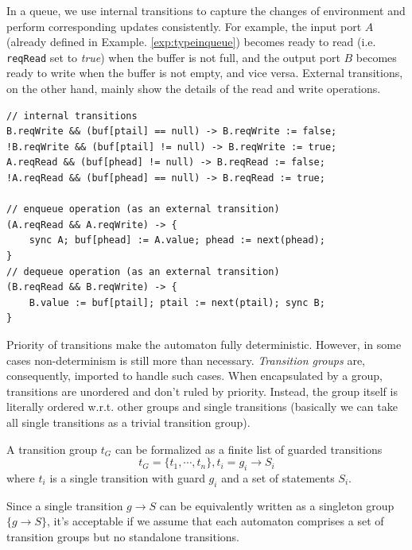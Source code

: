 \begin{example} In a queue, we use internal transitions to capture the changes of environment and perform corresponding updates consistently. For example, the input port $A$ (already defined in Example. \ref{exp:typeinqueue}) becomes ready to read (i.e. \texttt{reqRead} set to \emph{true}) when the buffer is not full, and the output port $B$ becomes ready to write when the buffer is not empty, and vice versa. External transitions, on the other hand, mainly show the details of the read and write operations.
\begin{lstlisting}
// internal transitions
B.reqWrite && (buf[ptail] == null) -> B.reqWrite := false;
!B.reqWrite && (buf[ptail] != null) -> B.reqWrite := true;
A.reqRead && (buf[phead] != null) -> B.reqRead := false;
!A.reqRead && (buf[phead] == null) -> B.reqRead := true;

// enqueue operation (as an external transition)
(A.reqRead && A.reqWrite) -> {
    sync A; buf[phead] := A.value; phead := next(phead);
}
// dequeue operation (as an external transition)
(B.reqRead && B.reqWrite) -> {
    B.value := buf[ptail]; ptail := next(ptail); sync B;
}
\end{lstlisting}
\label{exp:trans_queue}
\end{example}

Priority of transitions make the automaton fully deterministic. However, in some cases non-determinism is still more than necessary. \emph{Transition groups} are, consequently, imported to handle such cases. When encapsulated by a group, transitions are unordered and don't ruled by priority. Instead, the group itself is literally ordered w.r.t. other groups and single transitions (basically we can take all single transitions as a trivial transition group).

\begin{formalization}
    A transition group $t_G$ can be formalized as a finite list of guarded transitions
    \[
        t_G=\{t_1,\cdots, t_n\}, t_i=g_i\rightarrow S_i
    \]
    where $t_i$ is a single transition with guard $g_i$ and a set of statements $S_i$.
    \label{fmz:tgroup}
\end{formalization}

Since a single transition $g\rightarrow S$ can be equivalently written as a singleton group $\{g\rightarrow S\}$, it's acceptable if we assume that each automaton comprises a set of transition groups but no standalone transitions.

